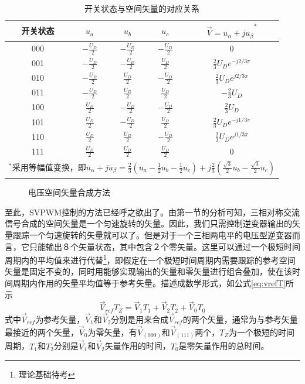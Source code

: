 \documentclass{ctexart}
\numberwithin{equation}{section}
\begin{document}
\begin{table}[hbt]
  \centering
  \caption{开关状态与空间矢量的对应关系}
  \label{tab:switch-mode}
  \begin{tabular}{ccccc}
  \toprule
  开关状态 & $u_a$            & $u_b$            & $u_c$            & ${\vec V=u_\alpha + ju_\beta }^\ast $      \\ \midrule
  000  & $-\frac{U_D}{2}$ & $-\frac{U_D}{2}$ & $-\frac{U_D}{2}$ & 0                            \\
  001  & $-\frac{U_D}{2}$ & $-\frac{U_D}{2}$ & $\frac{U_D}{2}$  & $\frac{2}{3}U_De^{-j2/3\pi}$ \\
  010  & $-\frac{U_D}{2}$ & $\frac{U_D}{2}$  & $-\frac{U_D}{2}$ & $\frac{2}{3}U_De^{j2/3\pi}$  \\
  011  & $-\frac{U_D}{2}$ & $\frac{U_D}{2}$  & $\frac{U_D}{2}$  & $-\frac{2}{3}U_D$            \\
  100  & $\frac{U_D}{2}$  & $-\frac{U_D}{2}$ & $-\frac{U_D}{2}$ & $\frac{2}{3}U_D$             \\
  101  & $\frac{U_D}{2}$  & $-\frac{U_D}{2}$ & $\frac{U_D}{2}$  & $\frac{2}{3}U_De^{-j1/3\pi}$ \\
  110  & $\frac{U_D}{2}$  & $\frac{U_D}{2}$  & $-\frac{U_D}{2}$ & $\frac{2}{3}U_De^{j1/3\pi}$  \\
  111  & $\frac{U_D}{2}$  & $\frac{U_D}{2}$  & $\frac{U_D}{2}$  & 0\\ \bottomrule
  \multicolumn{5}{l}{\footnotesize{${^{\ast}}$采用等幅值变换，即$u_\alpha + ju_\beta = \frac{2}{3}{(u_a-\frac{1}{2}u_b-\frac{1}{2}u_c)}+j\frac{2}{3}(\frac{\sqrt{3}}{2}u_b-\frac{\sqrt{3}}{2}u_c)$ }}                          
  \end{tabular}
\end{table}

\begin{figure}[hbt]
  \centering
  \def\svgwidth{.5\columnwidth}
  
  \caption{电压空间矢量合成方法}
  \label{fig:space-vector}
\end{figure}

至此，SVPWM控制的方法已经呼之欲出了。由第一节的分析可知，三相对称交流信号合成的空间矢量是一个匀速旋转的矢量。因此，我们只需控制逆变器输出的矢量跟踪一个匀速旋转的矢量就可以了。但是对于一个三相两电平的电压型逆变器而言，它只能输出８个矢量状态，其中包含２个零矢量。这里可以通过一个极短时间周期内的平均值来进行代替\footnote{理论基础待考}，即假定在一个极短时间周期内需要跟踪的参考空间矢量是固定不变的，同时用能够实现输出的矢量和零矢量进行组合叠加，使在该时间周期内作用的矢量平均值等于参考矢量。描述成数学形式，如公式\ref{eq:vrefT}所示
\begin{equation}
  \vec V_{ref}T_Z= \vec V_1 T_1 + \vec V_2 T_2 + \vec V_0 T_0
  \label{eq:vrefT}
\end{equation}
式中$\vec V_{ref}$为参考矢量，$\vec V_1$和$\vec V_2$分别是用来合成$\vec V_{ref}$的两个矢量，通常为与参考矢量最接近的两个矢量，$\vec V_{0}$为零矢量，有$\vec V_{(000)}$和$\vec V_{(111)}$两个，$T_Z$为一个极短的时间周期，$T_1$和$T_2$分别是$\vec V_1$和$\vec V_2$矢量作用的时间，$T_0$是零矢量作用的总时间。
\end{document}
